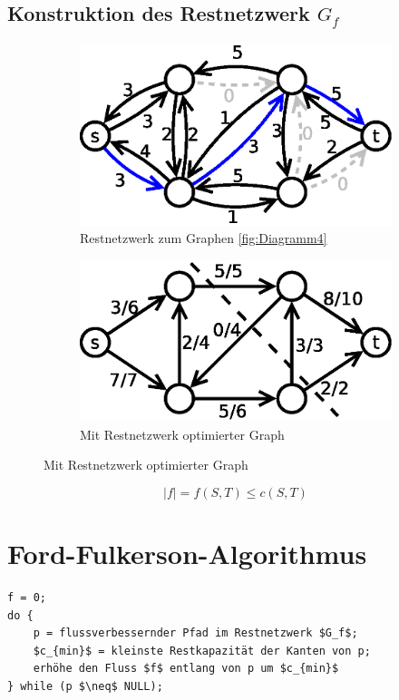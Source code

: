 \subsection{Konstruktion des Restnetzwerk $G_f$}
\begin{figure}[H]
\centering
\begin{subfigure}[H]{0.3\linewidth}
\includegraphics[width=\linewidth]{24/Grafik/Diagramm6}
\caption{Restnetzwerk zum Graphen \ref{fig:Diagramm4}}
\end{subfigure}
\begin{subfigure}[H]{0.3\linewidth}
\includegraphics[width=\linewidth]{24/Grafik/Diagramm7}
\caption{Mit Restnetzwerk optimierter Graph}
\end{subfigure}	
\label{fig:Diagramm6}
\end{figure}
\[ |f| = f(S,T) \leq c(S,T) \]
\section{Ford-Fulkerson-Algorithmus}
\begin{lstlisting}
f = 0;
do {
	p = flussverbessernder Pfad im Restnetzwerk $G_f$;
	$c_{min}$ = kleinste Restkapazität der Kanten von p;
	erhöhe den Fluss $f$ entlang von p um $c_{min}$
} while (p $\neq$ NULL);
\end{lstlisting}